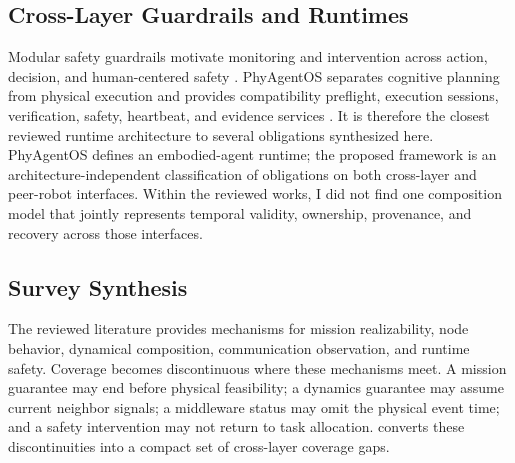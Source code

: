 \subsection{Cross-Layer Guardrails and Runtimes}

Modular safety guardrails motivate monitoring and intervention across action,
decision, and human-centered safety \cite{kim2026guardrails}.  PhyAgentOS
separates cognitive planning from physical execution and provides compatibility
preflight, execution sessions, verification, safety, heartbeat, and evidence
services \cite{liu2026phyagentos}.  It is therefore the closest reviewed runtime
architecture to several obligations synthesized here.  PhyAgentOS defines an
embodied-agent runtime; the proposed framework is an architecture-independent
classification of obligations on both cross-layer and peer-robot interfaces.
Within the reviewed works, I did not find one composition model that jointly
represents temporal validity, ownership, provenance, and recovery across those
interfaces.



\subsection{Survey Synthesis}

The reviewed literature provides mechanisms for mission realizability, node
behavior, dynamical composition, communication observation, and runtime safety.
Coverage becomes discontinuous where these mechanisms meet.  A mission
guarantee may end before physical
feasibility; a dynamics guarantee may assume current neighbor signals; a
middleware status may omit the physical event time; and a safety intervention
may not return to task allocation.   converts these discontinuities
into a compact set of cross-layer coverage gaps.

